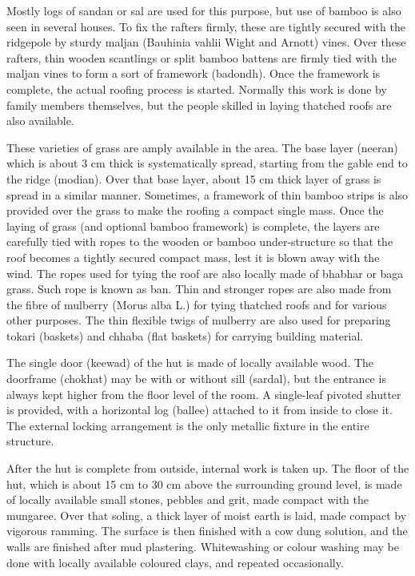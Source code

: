 Mostly logs of sandan or sal are used for this purpose, but use of bamboo is also seen in several houses. To fix the rafters firmly, these are tightly secured with the ridgepole by sturdy maljan (Bauhinia vahlii Wight and Arnott) vines. Over these rafters, thin wooden scantlings or split bamboo battens are firmly tied with the maljan vines to form a sort of framework (badondh). Once the framework is complete, the actual roofing process is started. Normally this work is done by family members themselves, but the people skilled in laying thatched roofs are also available.

These varieties of grass are amply available in the area. The base layer (neeran) which is about 3 cm thick is systematically spread, starting from the gable end to the ridge (modian). Over that base layer, about 15 cm thick layer of grass is spread in a similar manner. Sometimes, a framework of thin bamboo strips is also provided over the grass to make the roofing a compact single mass. Once the laying of grass (and optional bamboo framework) is complete, the layers are carefully tied with ropes to the wooden or bamboo under-structure so that the roof becomes a tightly secured compact mass, lest it is blown away with the wind. The ropes used for tying the roof are also locally made of bhabhar or baga grass. Such rope is known as ban. Thin and stronger ropes are also made from the fibre of mulberry (Morus alba L.) for tying thatched roofs and for various other purposes. The thin flexible twigs of mulberry are also used for preparing tokari (baskets) and chhaba (flat baskets) for carrying building material.

The single door (keewad) of the hut is made of locally available wood. The doorframe (chokhat) may be with or without sill (sardal), but the entrance is always kept higher from the floor level of the room. A single-leaf pivoted shutter is provided, with a horizontal log (ballee) attached to it from inside to close it. The external locking arrangement is the only metallic fixture in the entire structure.

After the hut is complete from outside, internal work is taken up. The floor of the hut, which is about 15 cm to 30 cm above the surrounding ground level, is made of locally available small stones, pebbles and grit, made compact with the mungaree. Over that soling, a thick layer of moist earth is laid, made compact by vigorous ramming. The surface is then finished with a cow dung solution, and the walls are finished after mud plastering. Whitewashing or colour washing may be done with locally available coloured clays, and repeated occasionally.

